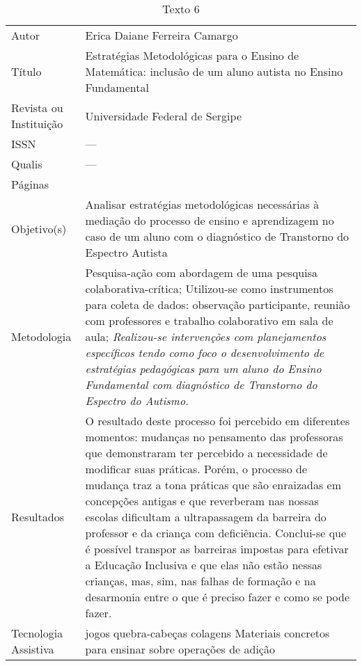 \documentclass[portuguese]{textolivre}
\begin{document}
\begin{footnotesize}
\begin{longtable}{
    >{\raggedright\arraybackslash}p{}
    >{\raggedright\arraybackslash}p{}
    }
\caption{Texto 6}
\label{tbl04}
\\
\toprule
Autor & Erica Daiane Ferreira Camargo \\
Título & Estratégias Metodológicas para o Ensino de Matemática: inclusão de um aluno autista no Ensino Fundamental \\
Revista ou Instituição & Universidade Federal de Sergipe \\
ISSN & --- \\
Qualis & --- \\
Páginas & 235 \\
Objetivo(s)	& Analisar estratégias metodológicas necessárias à mediação do processo de ensino e aprendizagem no caso de um aluno com o diagnóstico de Transtorno do Espectro Autista \\
Metodologia	& Pesquisa-ação com abordagem de uma pesquisa colaborativa-crítica;
Utilizou-se como instrumentos para coleta de dados: observação participante, reunião com professores e trabalho colaborativo em sala de aula; \newline
\emph{Realizou-se intervenções com planejamentos específicos tendo como foco o desenvolvimento de estratégias pedagógicas para um aluno do Ensino Fundamental com diagnóstico de Transtorno do Espectro do Autismo.} \\
Resultados & O resultado deste processo foi percebido em diferentes momentos: mudanças no pensamento das professoras que demonstraram ter percebido a necessidade de modificar suas práticas. Porém, o processo de mudança traz a tona práticas que são enraizadas em concepções antigas e que reverberam nas nossas escolas dificultam a ultrapassagem da barreira do professor e da criança com deficiência. \newline
Conclui-se que é possível transpor as barreiras impostas para efetivar a Educação Inclusiva e que elas não estão nessas crianças, mas, sim, nas falhas de formação e na desarmonia entre o que é preciso fazer e como se pode fazer. \\
Tecnologia Assistiva & jogos\newline
quebra-cabeças\newline
colagens\newline
Materiais concretos para ensinar sobre operações de adição\newline

\end{longtable}
\end{footnotesize}
\end{document}

